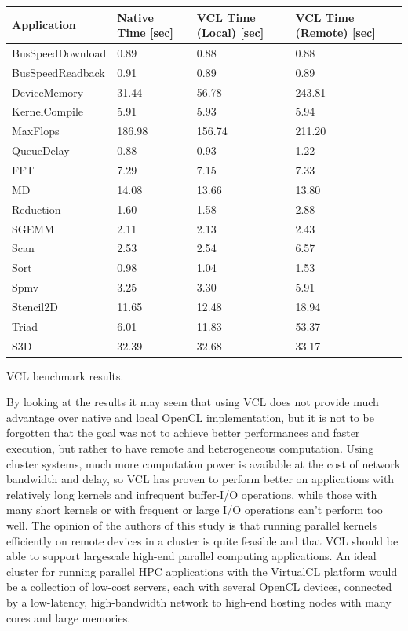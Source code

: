 \begin{tablehere}
{\footnotesize
\begin{tabular}{|p{}|p{}|p{}|p{}|}\hline
\textbf{Application} & \textbf{Native Time} [sec] & \textbf{VCL Time (Local)} [sec] & \textbf{VCL Time (Remote)} [sec]\\ \hline
BusSpeedDownload & 0.89 & 0.88 & 0.88 \\ \hline
BusSpeedReadback & 0.91 & 0.89 & 0.89 \\ \hline
DeviceMemory & 31.44 & 56.78 & 243.81 \\ \hline
KernelCompile & 5.91 & 5.93 & 5.94 \\ \hline
MaxFlops & 186.98 & 156.74 & 211.20 \\ \hline
QueueDelay & 0.88 & 0.93 & 1.22 \\ \hline
FFT & 7.29 & 7.15 & 7.33 \\ \hline
MD & 14.08 & 13.66 & 13.80 \\ \hline
Reduction & 1.60 & 1.58 & 2.88 \\ \hline
SGEMM & 2.11 & 2.13 & 2.43 \\ \hline
Scan & 2.53 & 2.54 & 6.57 \\ \hline
Sort & 0.98 & 1.04 & 1.53 \\ \hline
Spmv & 3.25 & 3.30 & 5.91 \\ \hline
Stencil2D & 11.65 & 12.48 & 18.94 \\ \hline
Triad & 6.01 & 11.83 & 53.37 \\ \hline
S3D & 32.39 & 32.68 & 33.17 \\ \hline
\end{tabular}}
  \caption{VCL benchmark results.}
	\label{tab:VCLBenchmark}
\end{tablehere}


By looking at the results it may seem that using VCL does not provide much advantage over native and local OpenCL implementation, but it is not to be forgotten that the goal was not to achieve better performances and faster execution, but rather to have remote and heterogeneous computation. Using cluster systems, much more computation power is available at the cost of network bandwidth and delay, so VCL has proven to perform better on applications with relatively long kernels and infrequent buffer-I/O operations, while those with many short kernels or with frequent or large I/O operations can't perform too well.
The opinion of the authors of this study is that running parallel kernels efficiently on remote devices in a cluster is quite feasible
and that VCL should be able to support largescale high-end parallel computing applications.
An ideal cluster for running parallel HPC applications with the VirtualCL platform would be a collection of low-cost servers, each with several OpenCL devices, connected by a low-latency, high-bandwidth network to high-end hosting nodes with many cores and large memories.









